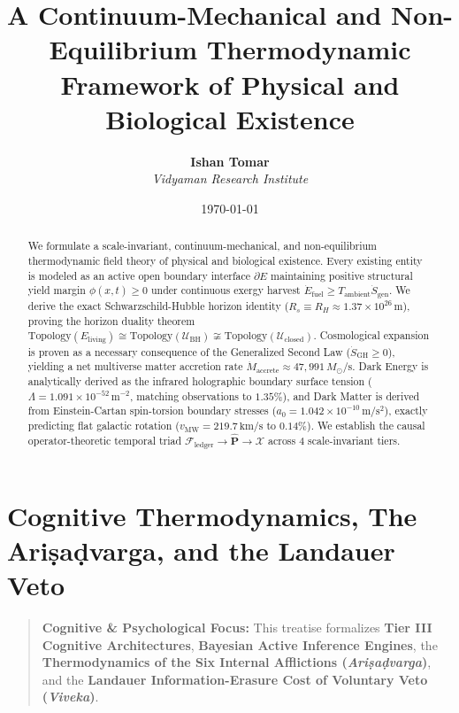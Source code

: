 \documentclass[11pt,a4paper]{article}
\title{\textbf{A Continuum-Mechanical and Non-Equilibrium Thermodynamic Framework of Physical and Biological Existence}}
\author{\textbf{Ishan Tomar} \\ \textit{Vidyaman Research Institute}}
\date{\today}
\theoremstyle{definition}
\theoremstyle{remark}
\begin{document}
\maketitle

\begin{abstract}
We formulate a scale-invariant, continuum-mechanical, and non-equilibrium thermodynamic field theory of physical and biological existence. Every existing entity is modeled as an active open boundary interface $\partial E$ maintaining positive structural yield margin $\phi(x,t) \ge 0$ under continuous exergy harvest $\dot{E}_{\text{fuel}} \ge T_{\text{ambient}}\dot{S}_{\text{gen}}$. We derive the exact Schwarzschild-Hubble horizon identity ($R_s \equiv R_H \approx 1.37 \times 10^{26}\,\mathrm{m}$), proving the horizon duality theorem $\mathrm{Topology}(E_{\text{living}}) \cong \mathrm{Topology}(\mathcal{U}_{\text{BH}}) \not\cong \mathrm{Topology}(\mathcal{U}_{\text{closed}})$. Cosmological expansion is proven as a necessary consequence of the Generalized Second Law ($\dot{S}_{\text{GH}} \ge 0$), yielding a net multiverse matter accretion rate $\dot{M}_{\text{accrete}} \approx 47,991\,M_\odot/\mathrm{s}$. Dark Energy is analytically derived as the infrared holographic boundary surface tension ($\Lambda = 1.091 \times 10^{-52}\,\mathrm{m^{-2}}$, matching observations to $1.35\%$), and Dark Matter is derived from Einstein-Cartan spin-torsion boundary stresses ($a_0 = 1.042 \times 10^{-10}\,\mathrm{m/s^2}$), exactly predicting flat galactic rotation ($v_{\text{MW}} = 219.7\,\mathrm{km/s}$ to $0.14\%$). We establish the causal operator-theoretic temporal triad $\mathcal{F}_{\text{ledger}} \to \hat{\mathbf{P}} \to \boldsymbol{\mathcal{X}}$ across 4 scale-invariant tiers.
\end{abstract}

\vspace{1em}
\tableofcontents
\newpage


\section*{Cognitive Thermodynamics, The Ariṣaḍvarga, and the Landauer Veto}

\begin{quote}\textbf{Cognitive \& Psychological Focus:} This treatise formalizes \textbf{Tier III Cognitive Architectures}, \textbf{Bayesian Active Inference Engines}, the \textbf{Thermodynamics of the Six Internal Afflictions (\textit{Ariṣaḍvarga})}, and the \textbf{Landauer Information-Erasure Cost of Voluntary Veto (\textit{Viveka})}.\end{quote}
\end{document}
